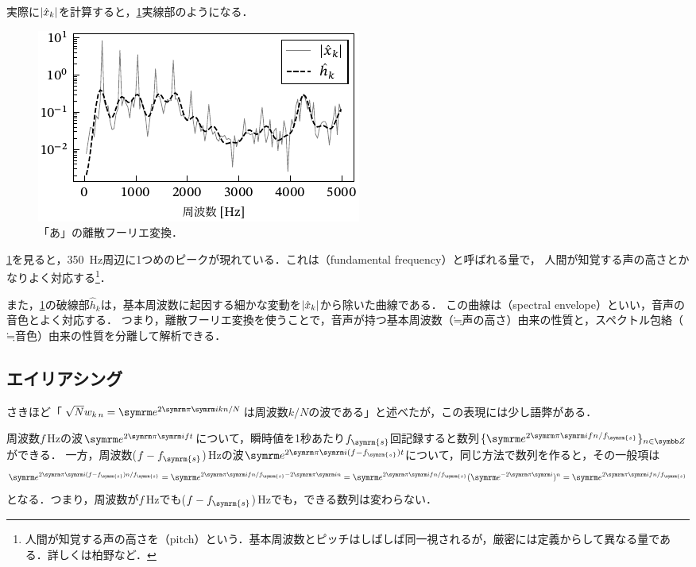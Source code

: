 \documentclass[../../main]{subfiles}
\begin{document}
実際に\(\lvert\hat{x}_k\rvert\)を計算すると，\cref{figure:frequency_domain}実線部のようになる．

\begin{figure}[htbp]
  \centering
  \includegraphics{figures/frequency_domain.pdf}
  \caption{「あ」の離散フーリエ変換．}
  \label{figure:frequency_domain}
\end{figure}

\cref{figure:frequency_domain}を見ると，\SI{350}{Hz}周辺に1つめのピークが現れている．これは（fundamental frequency）と呼ばれる量で，
人間が知覚する声の高さとかなりよく対応する\footnote{人間が知覚する声の高さを（pitch）という．基本周波数とピッチはしばしば同一視されるが，厳密には定義からして異なる量である．詳しくは柏野\cite{kashino}など．}．

また，\cref{figure:frequency_domain}の破線部\(\hat{h}_k\)は，基本周波数に起因する細かな変動を\(\lvert\hat{x}_k\rvert\)から除いた曲線である．
この曲線は（spectral envelope）といい，音声の音色とよく対応する．
つまり，離散フーリエ変換を使うことで，音声が持つ基本周波数（\(\mathord{\fallingdotseq}\text{声の高さ}\)）由来の性質と，スペクトル包絡（\(\mathord{\fallingdotseq}\text{音色}\)）由来の性質を分離して解析できる．

\subsection{エイリアシング}

さきほど「\(\sqrt{N}\midx{w}{k}{n}=\napr^{2\krez\iuni kn/N}\)は周波数\(k/N\)の波である」と述べたが，この表現には少し語弊がある．

周波数\(f\)\,\si{Hz}の波\(\napr^{2\krez\iuni ft}\)について，瞬時値を1秒あたり\(f_{\symrm{s}}\)回記録すると数列\(\seq{\napr^{2\krez\iuni fn/f_{\symrm{s}}}}_{n\in\numset{Z}}\)ができる．
一方，周波数(\(f-f_{\symrm{s}}\))\,\si{Hz}の波\(\napr^{2\krez\iuni(f-f_{\symrm{s}})t}\)について，同じ方法で数列を作ると，その一般項は
\[
  \napr^{2\krez\iuni(f-f_{\symrm{s}})n/f_{\symrm{s}}} = \napr^{2\krez\iuni fn/f_{\symrm{s}}-2\krez\iuni n}
  = \napr^{2\krez\iuni fn/f_{\symrm{s}}}(\napr^{-2\krez\iuni})^n
  = \napr^{2\krez\iuni fn/f_{\symrm{s}}}
\]
となる．つまり，周波数が\(f\)\,\si{Hz}でも(\(f-f_{\symrm{s}}\))\,\si{Hz}でも，できる数列は変わらない．
\end{document}
